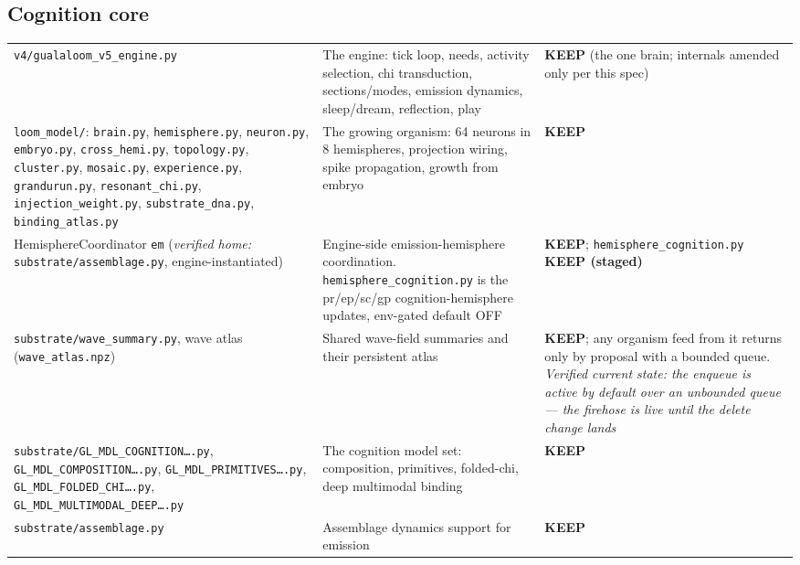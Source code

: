 \documentclass[11pt]{article}
\newcommand{\keep}{\textbf{KEEP}}
\newcommand{\keepstaged}{\textbf{KEEP (staged)}}
\begin{document}
\subsection{Cognition core}
\begin{longtable}{p{} p{} p{}}
\toprule
\texttt{v4/gualaloom\_v5\_engine.py} &
The engine: tick loop, needs, activity selection, chi transduction,
sections/modes, emission dynamics, sleep/dream, reflection, play &
\keep{} (the one brain; internals amended only per this spec) \\
\texttt{loom\_model/}: \texttt{brain.py}, \texttt{hemisphere.py},
\texttt{neuron.py}, \texttt{embryo.py}, \texttt{cross\_hemi.py},
\texttt{topology.py}, \texttt{cluster.py}, \texttt{mosaic.py},
\texttt{experience.py}, \texttt{grandurun.py}, \texttt{resonant\_chi.py},
\texttt{injection\_weight.py}, \texttt{substrate\_dna.py},
\texttt{binding\_atlas.py} &
The growing organism: 64 neurons in 8 hemispheres, projection wiring,
spike propagation, growth from embryo &
\keep{} \\
HemisphereCoordinator \texttt{em} (\emph{verified home:}
\texttt{substrate/assemblage.py}, engine-instantiated) &
Engine-side emission-hemisphere coordination.
\texttt{hemisphere\_cognition.py} is the pr/ep/sc/gp cognition-hemisphere
updates, env-gated default OFF &
\keep{}; \texttt{hemisphere\_cognition.py} \keepstaged{} \\
\texttt{substrate/wave\_summary.py}, wave atlas (\texttt{wave\_atlas.npz}) &
Shared wave-field summaries and their persistent atlas &
\keep{}; any organism feed from it returns only by proposal with a
bounded queue. \emph{Verified current state: the enqueue is active by
default over an unbounded queue — the firehose is live until the delete
change lands} \\
\texttt{substrate/GL\_MDL\_COGNITION\ldots.py},
\texttt{GL\_MDL\_COMPOSITION\ldots.py},
\texttt{GL\_MDL\_PRIMITIVES\ldots.py},
\texttt{GL\_MDL\_FOLDED\_CHI\ldots.py},
\texttt{GL\_MDL\_MULTIMODAL\_DEEP\ldots.py} &
The cognition model set: composition, primitives, folded-chi, deep
multimodal binding &
\keep{} \\
\texttt{substrate/assemblage.py} &
Assemblage dynamics support for emission &
\keep{} \\
\bottomrule
\end{longtable}
\end{document}
